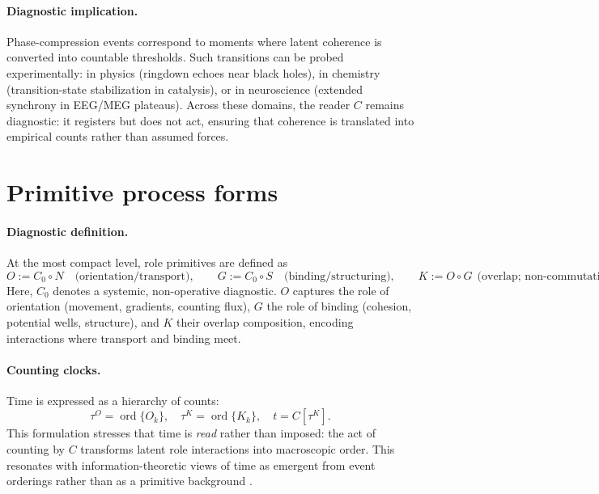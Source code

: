 \documentclass[12pt,a4paper,oneside]{scrreprt}
\begin{document}
\paragraph{Diagnostic implication.} 
Phase-compression events correspond to moments where latent coherence is converted into countable thresholds. 
Such transitions can be probed experimentally: in physics (ringdown echoes near black holes), in chemistry (transition-state stabilization in catalysis), or in neuroscience (extended synchrony in EEG/MEG plateaus). 
Across these domains, the reader $C$ remains diagnostic: it registers but does not act, ensuring that coherence is translated into empirical counts rather than assumed forces.

\section{Primitive process forms}\label{sec:ur-primitives}

\paragraph{Diagnostic definition.} 
At the most compact level, role primitives are defined as
\begin{equation}
O := C_0 \!\circ N \quad \text{(orientation/transport)}, 
\qquad
G := C_0 \!\circ S \quad \text{(binding/structuring)}, 
\qquad
K := O \!\circ G \ \ \text{(overlap; non-commutative)}.
\end{equation}
Here, $C_0$ denotes a systemic, non-operative diagnostic. 
$O$ captures the role of orientation (movement, gradients, counting flux), 
$G$ the role of binding (cohesion, potential wells, structure), 
and $K$ their overlap composition, encoding interactions where transport and binding meet. 

\paragraph{Counting clocks.} 
Time is expressed as a hierarchy of counts: 
\[
\tau^O = \operatorname{ord}\{O_k\}, \quad 
\tau^K = \operatorname{ord}\{K_k\}, \quad 
t = C[\tau^K].
\]
This formulation stresses that time is \emph{read} rather than imposed: 
the act of counting by $C$ transforms latent role interactions into macroscopic order. 
This resonates with information-theoretic views of time as emergent from event orderings 
rather than as a primitive background \citep{Rovelli1995Time}.
\end{document}
